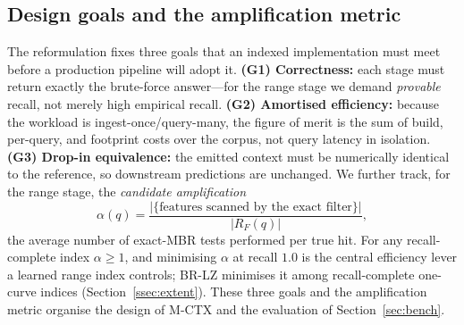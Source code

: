 \subsection{Design goals and the amplification metric}\label{ssec:goals}
The reformulation fixes three goals that an indexed implementation must
meet before a production pipeline will adopt it. \textbf{(G1) Correctness:}
each stage must return exactly the brute-force answer---for the range
stage we demand \emph{provable} recall, not merely high empirical recall.
\textbf{(G2) Amortised efficiency:} because the workload is
ingest-once/query-many, the figure of merit is the sum of build,
per-query, and footprint costs over the corpus, not query latency in
isolation. \textbf{(G3) Drop-in equivalence:} the emitted context must be
numerically identical to the reference, so downstream predictions are
unchanged. We further track, for the range stage, the \emph{candidate
amplification}
\begin{equation}
\alpha(q)=\frac{|\{\text{features scanned by the exact filter}\}|}{|R_F(q)|},
\end{equation}
the average number of exact-MBR tests performed per true hit. For any
recall-complete index $\alpha\!\ge\!1$, and minimising $\alpha$ at recall
$1.0$ is the central efficiency lever a learned range index controls;
BR-LZ minimises it among recall-complete one-curve indices
(Section~\ref{ssec:extent}). These three goals and the amplification
metric organise the design of M-CTX and the evaluation of
Section~\ref{sec:bench}.
